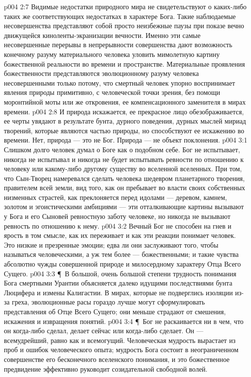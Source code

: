 \vs p004 2:7 Видимые недостатки природного мира не свидетельствуют о каких\hyp{}либо таких же соответствующих недостатках в характере Бога. Такие наблюдаемые несовершенства представляют собой просто неизбежные паузы при показе вечно движущейся киноленты\hyp{}экранизации вечности. Именно эти самые несовершенные перерывы в непрерывности совершенства дают возможность конечному разуму материального человека уловить мимолетную картину божественной реальности во времени и пространстве. Материальные проявления божественности представляются эволюционному разуму человека несовершенными только потому, что смертный человек упорно воспринимает явления природы примитивно, с человеческой точки зрения, без помощи моронтийной моты или же откровения, ее компенсационного заменителя в мирах времени.
\vs p004 2:8 И природа искажается, ее прекрасное лицо обезображивается, ее черты увядают в результате бунта, дурного поведения, дурных мыслей мириад творений, которые являются частью природы, но способствуют ее искажению во времени. Нет, природа --- это не Бог. Природа --- не объект поклонения.
\vs p004 3:1 Слишком долго человек думал о Боге как о подобном себе. Бог не испытывает, никогда не испытывал и никогда не будет испытывать ревности по отношению к человеку или какому\hyp{}либо другому существу во вселенной вселенных. При том, что Сын\hyp{}Творец намеревался сделать человека шедевром планетарного творения, правителем всей земли, вид того, как он пребывает во власти своих собственных низменных страстей, как преклоняется перед идолами --- деревом, камнем, золотом и эгоистическими амбициями --- эти отталкивающие картины вызывают у Бога и его Сыновей ревностную заботу  человеке, но никогда не вызывают ревность по отношению к нему.
\vs p004 3:2 Вечный Бог не способен на гнев и ярость в том смысле, как их переживает и как эти реакции понимает человек. Это низкие и презренные эмоции; едва ли они заслуживают того, чтобы называться человеческими, а уж тем более --- божественными; и такие чувства абсолютно чужды совершенной природе и милосердному характеру Отца Всего Сущего.
\vs p004 3:3 \P\ В большой, очень большой степени трудность понимания Бога смертными Урантии объясняется далеко идущими последствиями бунта Люцифера и измены Калигастии. В мирах, которые не подверглись изоляции из\hyp{}за греха, эволюционные расы гораздо лучше могут сформулировать представления об Отце Всего Сущего; они меньше страдают от смешения, искажения и извращения понятий.
\vs p004 3:4 \P\ Бог не раскаивается ни в чем, что он когда\hyp{}либо сделал, делает сейчас или когда\hyp{}либо сделает. Он --- всемудрейший, равно как и всемогущий. Человеческая мудрость вырастает из проб и ошибок человеческого опыта; мудрость Бога состоит в неограниченном совершенстве его бесконечного вселенского понимания, и это божественное предвидение эффективно руководит созидательной свободной волей.
